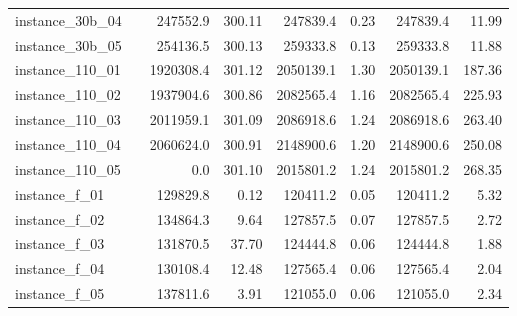 \documentclass[12pt,a4paper,openright,twoside]{book}
\begin{document}
\begin{table}[H]
{\begin{tabular}{|ll|rr|rr|rr|}
 instance\_30b\_04             &     &   247552.9 &   300.11 &  247839.4  &     0.23 &    247839.4 &    11.99 \\ 
 instance\_30b\_05             &     &   254136.5 &   300.13 &  259333.8  &     0.13 &    259333.8 &    11.88 \\ 
 instance\_110\_01            &     &  1920308.4 &   301.12 &  2050139.1  &     1.30 &   2050139.1 &   187.36 \\ 
 instance\_110\_02            &     &  1937904.6 &   300.86 &  2082565.4  &     1.16 &   2082565.4 &   225.93 \\ 
 instance\_110\_03            &     &  2011959.1 &   301.09 &  2086918.6  &     1.24 &   2086918.6 &   263.40 \\ 
 instance\_110\_04            &     &  2060624.0 &   300.91 &  2148900.6  &     1.20 &   2148900.6 &   250.08 \\ 
 instance\_110\_05            &     &        0.0 &   301.10 &  2015801.2  &     1.24 &   2015801.2 &   268.35 \\ 
 instance\_f\_01              &     &   129829.8 &     0.12 &  120411.2  &     0.05 &    120411.2 &     5.32 \\ 
 instance\_f\_02              &     &   134864.3 &     9.64 &  127857.5  &     0.07 &    127857.5 &     2.72 \\ 
 instance\_f\_03              &     &   131870.5 &    37.70 &  124444.8  &     0.06 &    124444.8 &     1.88 \\ 
 instance\_f\_04              &     &   130108.4 &    12.48 &  127565.4  &     0.06 &    127565.4 &     2.04 \\ 
 instance\_f\_05              &     &   137811.6 &     3.91 &  121055.0  &     0.06 &    121055.0 &     2.34 \\ 
  \hline
\end{tabular}
}
\end{table}
\end{document}
